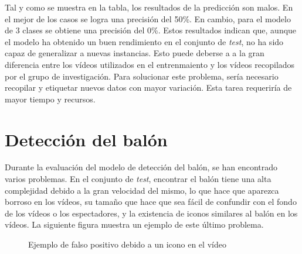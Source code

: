 \documentclass[12pt]{report} %
\begin{document}
    Tal y como se muestra en la tabla, los resultados de la predicción son
    malos. En el mejor de los casos se logra una precisión del 50\%. En cambio,
    para el modelo de 3 clases se obtiene una precisión del 0\%. Estos
    resultados indican que, aunque el modelo ha obtenido un buen rendimiento en
    el conjunto de \textit{test}, no ha sido capaz de generalizar a nuevas
    instancias. Esto puede deberse a a la gran diferencia entre los vídeos
    utilizados en el entrenmaiento y los vídeos recopilados por el grupo de
    investigación. Para solucionar este problema, sería necesario recopilar y
    etiquetar nuevos datos con mayor variación. Esta tarea requeriría de mayor
    tiempo y recursos.

    \section{Detección del balón}

    Durante la evaluación del modelo de detección del balón, se han encontrado
    varios problemas. En el conjunto de \textit{test}, encontrar el balón tiene
    una alta complejidad debido a la gran velocidad del mismo, lo que hace que
    aparezca borroso en los vídeos, su tamaño que hace que sea fácil de
    confundir con el fondo de los vídeos o los espectadores, y la existencia de
    iconos similares al balón en los vídeos. La siguiente figura muestra un
    ejemplo de este último problema.

    \begin{figure}[H]
        \centering
        \caption{Ejemplo de falso positivo debido a un icono en el vídeo}
    \end{figure}
\end{document}
